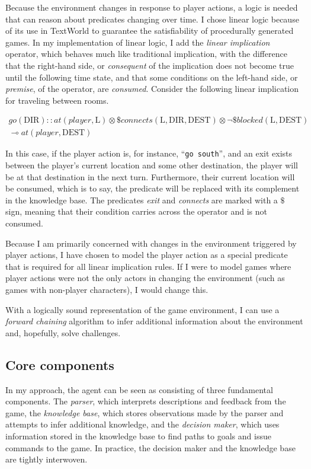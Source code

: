 Because the environment changes in response to player actions, a logic
is needed that can reason about predicates changing over time. I chose
linear logic because of its use in TextWorld to guarantee the
satisfiability of procedurally generated
games\cite{cote_textworld_2019}. In my implementation of linear logic, I
add the \emph{linear implication} operator, which behaves much like
traditional implication, with the difference that the right-hand side,
or \emph{consequent} of the implication does not become true until the
following time state, and that some conditions on the left-hand side, or
\emph{premise}, of the operator, are \emph{consumed}. Consider the
following linear implication for traveling between rooms.

\begin{gather*}
    go(\text{DIR}) :: at(player, \text{L}) \otimes
    \$ connects(\text{L}, \text{DIR}, \text{DEST}) \otimes
    \lnot \$ blocked(\text{L}, \text{DEST}) \\
    \multimap at(player, \text{DEST}) 
\end{gather*}

In this case, if the player action is, for instance, ``\texttt{go
south}'', and an exit exists between the player's current location and
some other destination, the player will be at that destination in the
next turn. Furthermore, their current location will be consumed, which
is to say, the predicate will be replaced with its complement in the
knowledge base. The predicates \emph{exit} and \emph{connects} are
marked with a $\$$ sign, meaning that their condition carries across the
operator and is not consumed.

Because I am primarily concerned with changes in the environment
triggered by player actions, I have chosen to model the player action as
a special predicate that is required for all linear implication rules.
If I were to model games where player actions were not the only actors
in changing the environment (such as games with non-player characters),
I would change this.

With a logically sound representation of the game environment, I can use
a \emph{forward chaining} algorithm to infer additional information
about the environment and, hopefully, solve challenges.

\subsection{Core components}

In my approach, the agent can be seen as consisting of three fundamental
components. The \emph{parser}, which interprets descriptions and
feedback from the game, the \emph{knowledge base}, which stores
observations made by the parser and attempts to infer additional
knowledge, and the \emph{decision maker}, which uses information stored
in the knowledge base to find paths to goals and issue commands to the
game. In practice, the decision maker and the knowledge base are tightly
interwoven.
